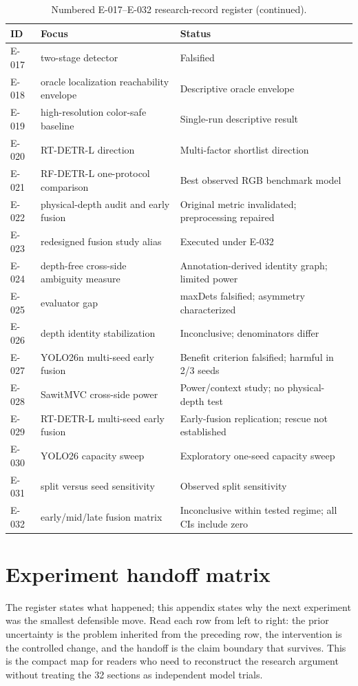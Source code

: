 \begin{table}[t]
\centering\small
\caption{Numbered E-017--E-032 research-record register (continued).}
\label{tab:register-b}
\begin{tabularx}{\textwidth}{L{0.10\textwidth}@{\hspace{0.8em}}L{0.40\textwidth}@{\hspace{0.8em}}Y}
\toprule
\textbf{ID} & \textbf{Focus} & \textbf{Status}\\
\midrule
E-017 & two-stage detector & Falsified\\
E-018 & oracle localization reachability envelope & Descriptive oracle envelope\\
E-019 & high-resolution color-safe baseline & Single-run descriptive result\\
E-020 & RT-DETR-L direction & Multi-factor shortlist direction\\
E-021 & RF-DETR-L one-protocol comparison & Best observed RGB benchmark model\\
E-022 & physical-depth audit and early fusion & Original metric invalidated; preprocessing repaired\\
E-023 & redesigned fusion study alias & Executed under E-032\\
E-024 & depth-free cross-side ambiguity measure & Annotation-derived identity graph; limited power\\
E-025 & evaluator gap & maxDets falsified; asymmetry characterized\\
E-026 & depth identity stabilization & Inconclusive; denominators differ\\
E-027 & YOLO26n multi-seed early fusion & Benefit criterion falsified; harmful in 2/3 seeds\\
E-028 & SawitMVC cross-side power & Power/context study; no physical-depth test\\
E-029 & RT-DETR-L multi-seed early fusion & Early-fusion replication; rescue not established\\
E-030 & YOLO26 capacity sweep & Exploratory one-seed capacity sweep\\
E-031 & split versus seed sensitivity & Observed split sensitivity\\
E-032 & early/mid/late fusion matrix & Inconclusive within tested regime; all CIs include zero\\
\bottomrule
\end{tabularx}
\end{table}

\section{Experiment handoff matrix}
\label{app:handoff}
The register states what happened; this appendix states why the next experiment
was the smallest defensible move. Read each row from left to right: the prior
uncertainty is the problem inherited from the preceding row, the intervention
is the controlled change, and the handoff is the claim boundary that survives.
This is the compact map for readers who need to reconstruct the research
argument without treating the 32 sections as independent model trials.


